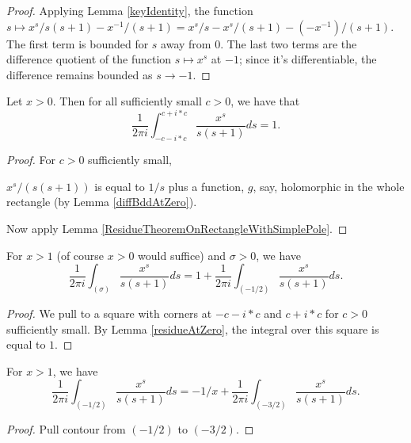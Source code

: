 \begin{proof}\leanok
Applying Lemma \ref{keyIdentity}, the
 function $s ↦ x^s/s(s+1) - x^{-1}/(s+1) = x^s/s - x^s/(s+1) - (-x^{-1})/(s+1)$. The first term is bounded for $s$
 away from $0$. The last two terms are the difference quotient of the function $s ↦ x^s$ at
 $-1$; since it's differentiable, the difference remains bounded as $s\to -1$.
\end{proof}


\begin{lemma}[residueAtZero]\label{residueAtZero}\leanok
Let $x>0$. Then for all sufficiently small $c>0$, we have that
$$
\frac1{2\pi i}
\int_{-c-i*c}^{c+ i*c}\frac{x^s}{s(s+1)}ds = 1.
$$
\end{lemma}


\begin{proof}\leanok
{}
For $c>0$ sufficiently small,

 $x^s/(s(s+1))$ is equal to $1/s$ plus a function, $g$, say,
holomorphic in the whole rectangle (by Lemma \ref{diffBddAtZero}).

 Now apply Lemma \ref{ResidueTheoremOnRectangleWithSimplePole}.

\end{proof}


\begin{lemma}[residuePull1]\label{residuePull1}\leanok
For $x>1$ (of course $x>0$ would suffice) and $\sigma>0$, we have
$$
\frac1{2\pi i}
\int_{(\sigma)}\frac{x^s}{s(s+1)}ds =1
+
\frac 1{2\pi i}
\int_{(-1/2)}\frac{x^s}{s(s+1)}ds.
$$
\end{lemma}


\begin{proof}\leanok
{}
We pull to a square with corners at $-c-i*c$ and $c+i*c$ for $c>0$
sufficiently small.
By Lemma \ref{residueAtZero}, the integral over this square is equal to $1$.
\end{proof}


\begin{lemma}[residuePull2]\label{residuePull2}\leanok
For $x>1$, we have
$$
\frac1{2\pi i}
\int_{(-1/2)}\frac{x^s}{s(s+1)}ds = -1/x +
\frac 1{2\pi i}
\int_{(-3/2)}\frac{x^s}{s(s+1)}ds.
$$
\end{lemma}


\begin{proof}\leanok
{}
Pull contour from $(-1/2)$ to $(-3/2)$.
\end{proof}


